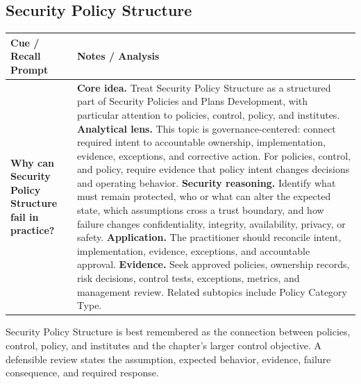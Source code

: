 \documentclass[11pt]{article}
\newcommand{\CornellHeader}{%
\rowcolor{Navy}\color{white}\bfseries Cue / Recall Prompt & \color{white}\bfseries Notes / Analysis\\\hline}
\newcommand{\CornellRow}[2]{%
\cellcolor{CueGray}\RaggedRight\textbf{#1} & \RaggedRight #2\\\hline}
\begin{document}
\subsection*{Security Policy Structure}
\begin{longtable}{>{\RaggedRight\arraybackslash}p{}|>{\RaggedRight\arraybackslash}p{}}
\CornellHeader
\CornellRow{Why can Security Policy Structure fail in practice?}{\textbf{Core idea.} Treat Security Policy Structure as a structured part of Security Policies and Plans Development, with particular attention to policies, control, policy, and institutes. \textbf{Analytical lens.} This topic is governance-centered: connect required intent to accountable ownership, implementation, evidence, exceptions, and corrective action. For policies, control, and policy, require evidence that policy intent changes decisions and operating behavior. \textbf{Security reasoning.} Identify what must remain protected, who or what can alter the expected state, which assumptions cross a trust boundary, and how failure changes confidentiality, integrity, availability, privacy, or safety. \textbf{Application.} The practitioner should reconcile intent, implementation, evidence, exceptions, and accountable approval. \textbf{Evidence.} Seek approved policies, ownership records, risk decisions, control tests, exceptions, metrics, and management review. Related subtopics include Policy Category Type.}
\end{longtable}
\begin{topicsummary}
Security Policy Structure is best remembered as the connection between policies, control, policy, and institutes and the chapter's larger control objective. A defensible review states the assumption, expected behavior, evidence, failure consequence, and required response.
\end{topicsummary}
\end{document}
